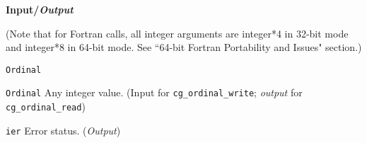 \noindent
\textbf{\textcolor{input}{Input}/\textcolor{output}{\textit{Output}}}

\noindent (Note that for Fortran calls, all integer arguments are integer*4 in 32-bit mode and integer*8 in 64-bit mode.
See ``64-bit Fortran Portability and Issues" section.)

\begin{Ventryi}{\texttt{Ordinal}}\raggedright
\item [\texttt{Ordinal}]
      Any integer value.
      (\textcolor{input}{Input} for \texttt{cg\_ordinal\_write};
      \textcolor{output}{\textit{output}} for \texttt{cg\_ordinal\_read})
\item [\texttt{ier}]
      Error status.
      (\textcolor{output}{\textit{Output}})
\end{Ventryi}
